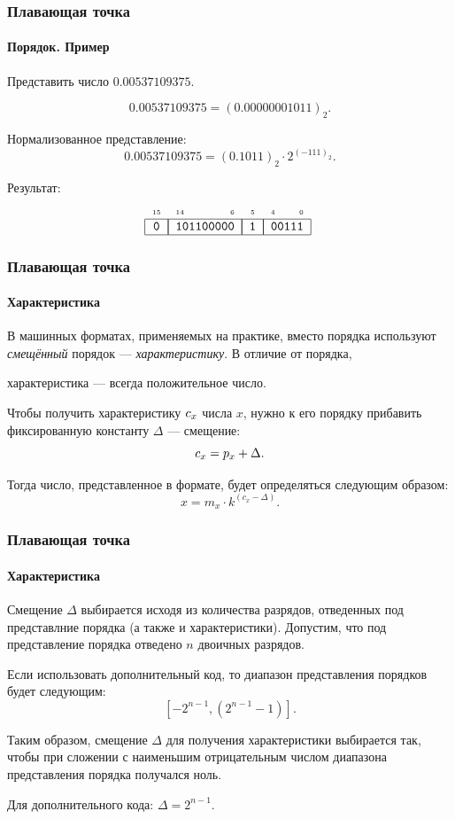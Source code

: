 \begin{frame}
    \frametitle{Плавающая точка}
    \framesubtitle{Порядок. Пример}
    
    Представить число $0.00537109375$.
    
    \[0.00537109375 = (0.00000001011)_2.\]
    
    Нормализованное представление:
    \[0.00537109375 = (0.1011)_2\cdot 2^{(-111)_2}.\]

   Результат:
    \[
        \FloatMyHex{0}{101100000}{1}{00111}
    \]
\end{frame}

\begin{frame}
    \frametitle{Плавающая точка}
    \framesubtitle{Характеристика}
    
    В машинных форматах, применяемых на практике, вместо порядка используют \emph{смещённый} порядок --- \emph{характеристику}. В отличие от порядка, 
    \begin{block}{}
        характеристика --- всегда положительное число. 
    \end{block}
    
    Чтобы получить характеристику $c_{x}$ числа $x$, нужно к его порядку прибавить фиксированную константу $\Delta$ --- смещение:
    \[
        c_{x} = p_{x} + \Delta.
    \]
    
    Тогда число, представленное в формате, будет определяться следующим образом: 
    \[
        x = m_x\cdot k^{(c_x - \Delta)}.
    \]
\end{frame}
  
\begin{frame}
    \frametitle{Плавающая точка}
    \framesubtitle{Характеристика}
    
    Смещение $\Delta$ выбирается исходя из количества разрядов, отведенных под представлние порядка (а также и характеристики). Допустим, что под представление порядка отведено $n$ двоичных разрядов. 
    
    Если использовать дополнительный код, то диапазон представления порядков будет следующим: 
    \[
        [-2^{n-1},(2^{n-1}-1)].
    \]
    
    Таким образом, смещение $\Delta$ для получения характеристики выбирается так, чтобы при сложении с наименьшим отрицательным числом диапазона представления порядка получался ноль.
    
    Для дополнительного кода: $\Delta = 2^{n-1}$.
\end{frame}
  
